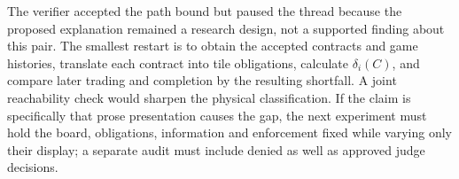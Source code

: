 \documentclass{article}
\begin{document}
The verifier accepted the path bound but paused the thread because the proposed explanation remained a
research design, not a supported finding about this pair. The smallest restart is to obtain the accepted
contracts and game histories, translate each contract into tile obligations, calculate \(\delta_i(C)\), and
compare later trading and completion by the resulting shortfall. A joint reachability check would sharpen the
physical classification. If the claim is specifically that prose presentation causes the gap, the next
experiment must hold the board, obligations, information and enforcement fixed while varying only their
display; a separate audit must include denied as well as approved judge decisions.



\end{document}
